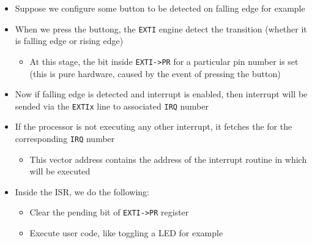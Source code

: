 \begin{itemize}

\item Suppose we configure some button to be detected on falling edge for example

\item When we press the buttong, the \verb|EXTI| engine detect the transition (whether it is falling edge or rising edge)

	\begin{itemize}
	
	\item At this stage, the bit inside \verb|EXTI->PR| for a particular pin number is set (this is pure hardware, caused by the event of pressing the button)
	
	\end{itemize}

\item Now if falling edge is detected and interrupt is enabled, then interrupt will be sended via the \verb|EXTIx| line to associated \verb|IRQ| number

\item If the processor is not executing any other interrupt, it fetches the   for the corresponding \verb|IRQ| number

	\begin{itemize}
	\item This vector address contains the address of the interrupt routine in which will be executed
	\end{itemize}


\item Inside the ISR, we do the following:

	\begin{itemize}
	\item Clear the pending bit of \verb|EXTI->PR| register
	
	\item Execute user code, like toggling a LED for example
	
	\end{itemize}

\end{itemize}






